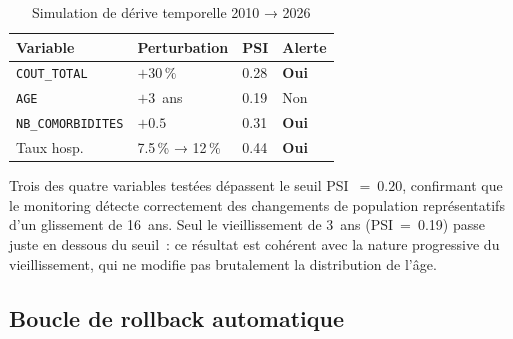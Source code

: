 \begin{table}[htbp]
\centering
\caption{Simulation de dérive temporelle 2010 → 2026}
\label{tab:drift}
\begin{tabular}{@{}llll@{}}
\toprule
\textbf{Variable} & \textbf{Perturbation} & \textbf{PSI} & \textbf{Alerte} \\
\midrule
\texttt{COUT\_TOTAL}    & $+30\,\%$          & 0.28 & \textcolor{danger}{\textbf{Oui}} \\
\texttt{AGE}            & $+3$~ans           & 0.19 & Non \\
\texttt{NB\_COMORBIDITES} & $+0.5$           & 0.31 & \textcolor{danger}{\textbf{Oui}} \\
Taux hosp.              & 7.5\,\% → 12\,\%  & 0.44 & \textcolor{danger}{\textbf{Oui}} \\
\bottomrule
\end{tabular}
\end{table}

Trois des quatre variables testées dépassent le seuil PSI~$=~0.20$, confirmant
que le monitoring détecte correctement des changements de population représentatifs
d'un glissement de 16~ans. Seul le vieillissement de 3~ans (PSI~=~0.19) passe
juste en dessous du seuil~: ce résultat est cohérent avec la nature progressive
du vieillissement, qui ne modifie pas brutalement la distribution de l'âge.

\subsection{Boucle de rollback automatique}

